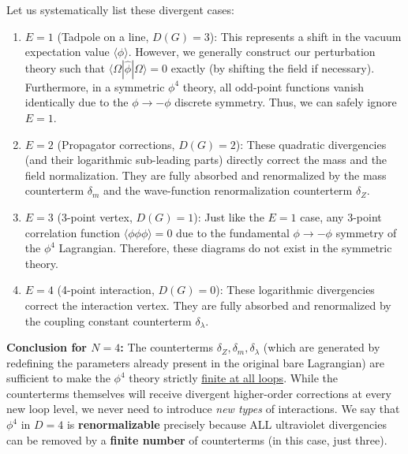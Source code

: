 Let us systematically list these divergent cases:
\begin{enumerate}
    \item[\textbf{a)}] \textbf{\(E=1\)} (Tadpole on a line, \(D(G)=3\)):
          This represents a shift in the vacuum expectation value \(\langle \phi \rangle\). However, we generally construct our perturbation theory such that \(\langle \Omega | \hat{\phi} | \Omega \rangle = 0\) exactly (by shifting the field if necessary). Furthermore, in a symmetric \(\phi^4\) theory, all odd-point functions vanish identically due to the \(\phi \to -\phi\) discrete symmetry. Thus, we can safely ignore \(E=1\).

    \item[\textbf{b)}] \textbf{\(E=2\)} (Propagator corrections, \(D(G)=2\)):
          These quadratic divergencies (and their logarithmic sub-leading parts) directly correct the mass and the field normalization. They are fully absorbed and renormalized by the mass counterterm \(\delta_m\) and the wave-function renormalization counterterm \(\delta_Z\).

    \item[\textbf{c)}] \textbf{\(E=3\)} (3-point vertex, \(D(G)=1\)):
          Just like the \(E=1\) case, any 3-point correlation function \(\langle \phi\phi\phi \rangle = 0\) due to the fundamental \(\phi \to -\phi\) symmetry of the \(\phi^4\) Lagrangian. Therefore, these diagrams do not exist in the symmetric theory.

    \item[\textbf{d)}] \textbf{\(E=4\)} (4-point interaction, \(D(G)=0\)):
          These logarithmic divergencies correct the interaction vertex. They are fully absorbed and renormalized by the coupling constant counterterm \(\delta_\lambda\).
\end{enumerate}

\textbf{Conclusion for \(N=4\):} The counterterms \(\delta_Z, \delta_m, \delta_\lambda\) (which are generated by redefining the parameters already present in the original bare Lagrangian) are sufficient to make the \(\phi^4\) theory strictly \uline{finite at all loops}. While the counterterms themselves will receive divergent higher-order corrections at every new loop level, we never need to introduce \textit{new types} of interactions. We say that \(\phi^4\) in \(D=4\) is \textbf{renormalizable} precisely because ALL ultraviolet divergencies can be removed by a \textbf{finite number} of counterterms (in this case, just three).

